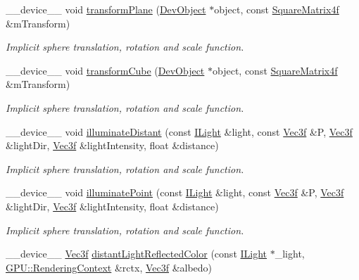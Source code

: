 \begin{DoxyCompactItemize}
\item 
\+\_\+\+\_\+device\+\_\+\+\_\+ void \hyperlink{group__intersection__test__prperties_ga6d2ae68047e8f8d11a64b9dc9dda507d}{transform\+Plane} (\hyperlink{class_dev_object}{Dev\+Object} $\ast$object, const \hyperlink{class_square_matrix4}{Square\+Matrix4f} \&m\+Transform)
\begin{DoxyCompactList}\small\item\em Implicit sphere translation, rotation and scale function. \end{DoxyCompactList}\item 
\+\_\+\+\_\+device\+\_\+\+\_\+ void \hyperlink{group__intersection__test__prperties_ga00e56ff810e7ba397e903acf50626b55}{transform\+Cube} (\hyperlink{class_dev_object}{Dev\+Object} $\ast$object, const \hyperlink{class_square_matrix4}{Square\+Matrix4f} \&m\+Transform)
\begin{DoxyCompactList}\small\item\em Implicit sphere translation, rotation and scale function. \end{DoxyCompactList}\item 
\+\_\+\+\_\+device\+\_\+\+\_\+ void \hyperlink{group__intersection__test__prperties_ga6a438778f6ed8683785d7a892a05d312}{illuminate\+Distant} (const \hyperlink{class_i_light}{I\+Light} \&light, const \hyperlink{class_vec3}{Vec3f} \&P, \hyperlink{class_vec3}{Vec3f} \&light\+Dir, \hyperlink{class_vec3}{Vec3f} \&light\+Intensity, float \&distance)
\begin{DoxyCompactList}\small\item\em Implicit sphere translation, rotation and scale function. \end{DoxyCompactList}\item 
\+\_\+\+\_\+device\+\_\+\+\_\+ void \hyperlink{group__intersection__test__prperties_gab3c663df5b5a29d04083e7793bce50d5}{illuminate\+Point} (const \hyperlink{class_i_light}{I\+Light} \&light, const \hyperlink{class_vec3}{Vec3f} \&P, \hyperlink{class_vec3}{Vec3f} \&light\+Dir, \hyperlink{class_vec3}{Vec3f} \&light\+Intensity, float \&distance)
\begin{DoxyCompactList}\small\item\em Implicit sphere translation, rotation and scale function. \end{DoxyCompactList}\item 
\+\_\+\+\_\+device\+\_\+\+\_\+ \hyperlink{class_vec3}{Vec3f} \hyperlink{group__intersection__test__prperties_ga19abb6bc50199d8583aafedd0e044b7e}{distant\+Light\+Reflected\+Color} (const \hyperlink{class_i_light}{I\+Light} $\ast$\+\_\+light, \hyperlink{struct_g_p_u_1_1_rendering_context}{G\+P\+U\+::\+Rendering\+Context} \&rctx, \hyperlink{class_vec3}{Vec3f} \&albedo)

\end{DoxyCompactItemize}
